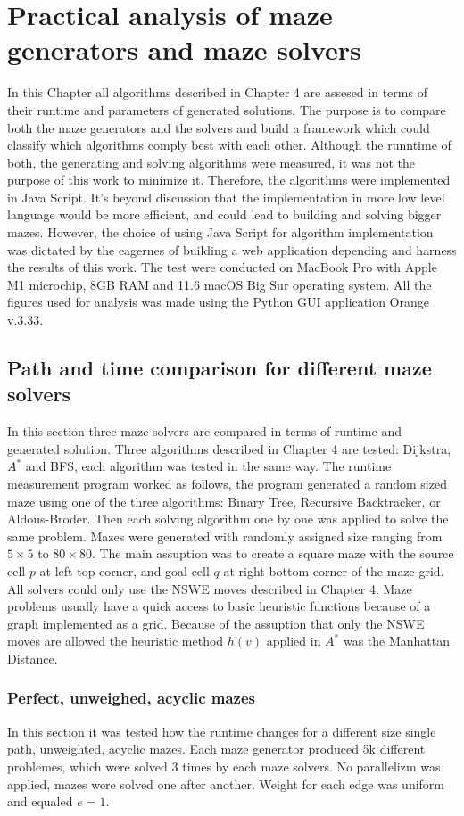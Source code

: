 \chapter{Practical analysis of maze generators and maze solvers}%
In this Chapter all algorithms described in Chapter 4 are assesed in terms of their runtime and parameters of generated solutions. The purpose is to compare 
both the maze generators and the solvers and build a framework which could classify which algorithms comply best with each other. Although the runntime of both, the generating
and solving algorithms were measured, it was not the purpose of this work to minimize it. Therefore, the algorithms were implemented in Java Script. It's beyond 
discussion that the implementation in more low level language would be more efficient, and could lead to building and solving bigger mazes. However, the choice of using
Java Script for algorithm implementation was dictated by the eagernes of building a web application depending and harness the results of this work. The test were conducted 
on MacBook Pro with Apple M1 microchip, 8GB RAM and 11.6 macOS Big Sur operating system. All the figures used for analysis was made using the Python GUI application Orange v.3.33.
\section{Path and time comparison for different maze solvers}
In this section three maze solvers are compared in terms of runtime and generated solution. Three algorithms described in Chapter 4 are tested:
Dijkstra, $A^*$ and BFS, each algorithm was tested in the same way. The runtime measurement program worked as follows, the program generated a random sized maze using one of the three algorithms:
Binary Tree, Recursive Backtracker, or Aldous-Broder. Then each solving algorithm one by one was applied to solve the same problem. Mazes were generated with randomly assigned
size ranging from $5 \times 5$ to $80 \times 80$. The main assuption was to create a square maze with the source cell $p$ at left top corner, and goal cell $q$ at right bottom corner of the maze grid. 
All solvers could only use the NSWE moves described in Chapter 4. Maze problems usually have a quick access to basic heuristic functions because of a graph implemented as a grid. 
Because of the assuption that only the NSWE moves are allowed the heuristic method $h(v)$ applied in $A^*$ was the Manhattan Distance. 
\subsection{Perfect, unweighed, acyclic mazes}
In this section it was tested how the runtime changes for a different size single path, unweighted, acyclic mazes. Each maze generator produced 5k different problemes, which were solved 3 times by each
maze solvers. No parallelizm was applied, mazes were solved one after another. Weight for each edge was uniform and equaled $e = 1$.

